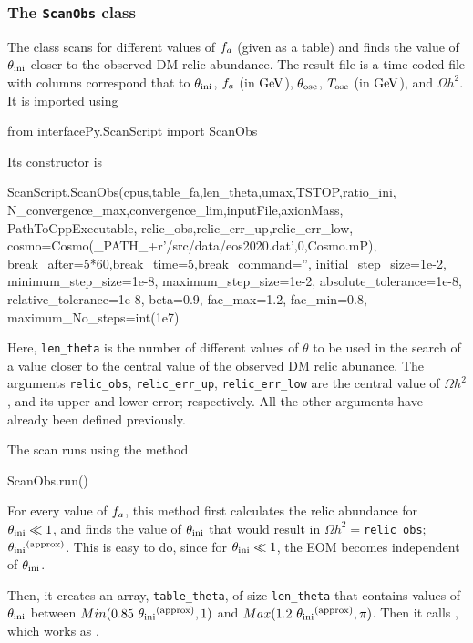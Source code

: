 \documentclass[11pt,a4paper]{article}
\begin{document}
\subsubsection{The {\tt ScanObs} class}\label{app:ScanObs}
%
The  class scans for different values of $f_{a}{}$ (given as a table) and finds the value of $\theta_{\rm ini}{}$ closer to the observed DM relic abundance. The result file is a time-coded file with columns correspond that to $\theta_{\rm ini}{}$,  $f_{a}{}$ (in ${\rm GeV}$), $\theta_{\rm osc}{}$, $T_{\rm osc}{}$ (in ${\rm GeV}$), and $\Omega h^2$. 
%
It is imported using 
%
\begin{py}
	from interfacePy.ScanScript import ScanObs
\end{py}
%
Its constructor is
%
\begin{py}
	ScanScript.ScanObs(cpus,table_fa,len_theta,umax,TSTOP,ratio_ini,
					N_convergence_max,convergence_lim,inputFile,axionMass,
					PathToCppExecutable, relic_obs,relic_err_up,relic_err_low,
					cosmo=Cosmo(_PATH_+r'/src/data/eos2020.dat',0,Cosmo.mP),
					break_after=5*60,break_time=5,break_command='',
					initial_step_size=1e-2, minimum_step_size=1e-8, maximum_step_size=1e-2, 
					absolute_tolerance=1e-8, relative_tolerance=1e-8,
					beta=0.9, fac_max=1.2, fac_min=0.8, maximum_No_steps=int(1e7)
\end{py}
%
Here, {\tt len\_theta} is the number of different values of $\theta$ to be used in the search of a value closer to the central value of the observed DM relic abunance. The arguments {\tt relic\_obs}, {\tt relic\_err\_up}, {\tt relic\_err\_low} are the central value of $\Omega h^2$, and its upper and lower error; respectively. All the other arguments have already been defined previously.  

The scan runs using the method
%
\begin{py}
	ScanObs.run()
\end{py} 
%
For every value of $f_{a}{}$, this method first calculates the relic abundance for $\theta_{\rm ini}{} \ll 1$, and finds the value of $\theta_{\rm ini}{}$ that would result in $\Omega h^2 = ${\tt relic\_obs}; $\theta_{\rm ini}{}^{\rm (approx)}$. This is easy to do, since for $\theta_{\rm ini}{} \ll 1$, the EOM becomes independent of $\theta_{\rm ini}{}$. 

Then, it creates an array, {\tt table\_theta}, of size {\tt len\_theta} that contains values of $\theta_{\rm ini}{}$ between $Min(0.85 \ \theta_{\rm ini}{}^{\rm (approx)},1)$ and  
$Max(1.2 \ \theta_{\rm ini}{}^{\rm (approx)},\pi)$.  Then it calls , which works as . 
\end{document}

